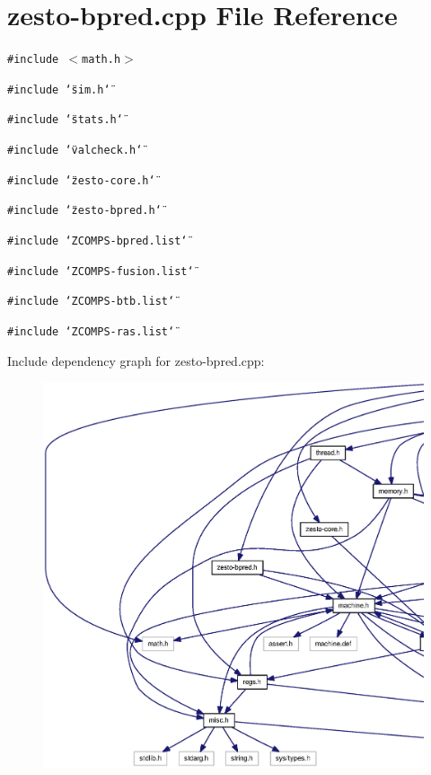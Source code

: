 \section{zesto-bpred.cpp File Reference}
\label{zesto-bpred_8cpp}
{\tt \#include $<$math.h$>$}\par
{\tt \#include \char`\"{}sim.h\char`\"{}}\par
{\tt \#include \char`\"{}stats.h\char`\"{}}\par
{\tt \#include \char`\"{}valcheck.h\char`\"{}}\par
{\tt \#include \char`\"{}zesto-core.h\char`\"{}}\par
{\tt \#include \char`\"{}zesto-bpred.h\char`\"{}}\par
{\tt \#include \char`\"{}ZCOMPS-bpred.list\char`\"{}}\par
{\tt \#include \char`\"{}ZCOMPS-fusion.list\char`\"{}}\par
{\tt \#include \char`\"{}ZCOMPS-btb.list\char`\"{}}\par
{\tt \#include \char`\"{}ZCOMPS-ras.list\char`\"{}}\par


Include dependency graph for zesto-bpred.cpp:\nopagebreak
\begin{figure}[H]
\begin{center}
\leavevmode
\includegraphics[width=420pt]{zesto-bpred_8cpp__incl}
\end{center}
\end{figure}
